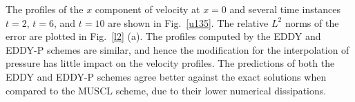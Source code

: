 The profiles of the $x$ component of velocity at $x=0$ and several time instances $t=2$, $t=6$, and $t=10$ are shown in Fig.~\ref{u135}. The relative $L^{2}$ norms of the error are plotted in Fig.~\ref{l2} (a). The profiles computed by the EDDY and EDDY-P schemes are similar, and hence the modification for the interpolation of pressure has little impact on the velocity profiles. The predictions of both the EDDY and EDDY-P schemes agree better against the exact solutions when compared to the MUSCL scheme, due to their lower numerical dissipations.
\begin{figure}[t]  
\centering

\end{figure}
